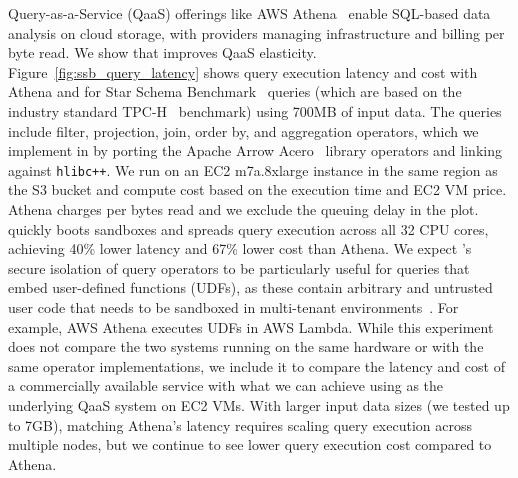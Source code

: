  Query-as-a-Service (QaaS) offerings like AWS Athena~\cite{athena} enable SQL-based data analysis on cloud storage, with providers managing infrastructure and billing per byte read.
We show that \dandelion improves QaaS elasticity.
Figure~\ref{fig:ssb_query_latency} shows query execution latency and cost with Athena and \dandelion for Star Schema Benchmark~\cite{ssb-benchmark} queries (which are based on the industry standard TPC-H~\cite{tpch} benchmark) using 700MB of input data. The queries include filter, projection, join, order by, and aggregation operators, which we implement in \dandelion by porting the Apache Arrow Acero~\cite{acero} library operators and linking against \texttt{hlibc++}. We run \dandelion on an EC2 m7a.8xlarge instance in the same region as the S3 bucket and compute cost based on the execution time and EC2 VM price. Athena charges per bytes read and we exclude the queuing delay in the plot.
\dandelion quickly boots sandboxes and spreads query execution across all 32 CPU cores, achieving 40\% lower latency and 67\% lower cost than Athena. We expect \dandelion's secure isolation of query operators to be particularly useful for queries that embed user-defined functions (UDFs), as these contain arbitrary and untrusted user code that needs to be sandboxed in multi-tenant environments~\cite{containerized-udf}. For example, AWS Athena executes UDFs in AWS Lambda.
While this experiment does not compare the two systems running on the same hardware or with the same operator implementations, we include it to compare the latency and cost of a commercially available service with what we can achieve using \dandelion as the underlying QaaS system on EC2 VMs. 
With larger input data sizes (we tested up to 7GB), matching Athena's latency requires scaling query execution across multiple \dandelion nodes, but we continue to see lower query execution cost compared to Athena.

